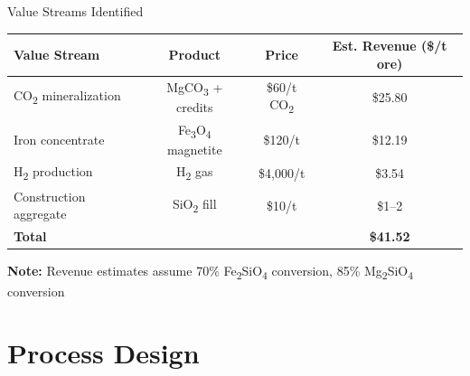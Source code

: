\documentclass[aspectratio=169]{beamer}
\begin{document}
\begin{frame}{Value Streams Identified}

\begin{table}
\centering\small
\begin{tabular}{lccc}
\toprule
\textbf{Value Stream} & \textbf{Product} & \textbf{Price} & \textbf{Est. Revenue (\$/t ore)} \\
\midrule
CO\textsubscript{2} mineralization & MgCO\textsubscript{3} + credits & \$60/t CO\textsubscript{2} & \textcolor{revenue}{\$25.80} \\
Iron concentrate & Fe\textsubscript{3}O\textsubscript{4} magnetite & \$120/t & \textcolor{revenue}{\$12.19} \\
H\textsubscript{2} production & H\textsubscript{2} gas & \$4,000/t & \textcolor{revenue}{\$3.54} \\
Construction aggregate & SiO\textsubscript{2} fill & \$10/t & \textcolor{neutral}{\$1--2} \\
\midrule
\textbf{Total} & & & \textcolor{revenue}{\textbf{\$41.52}} \\
\bottomrule
\end{tabular}
\end{table}

\vspace{0.5em}
\textcolor{StepYellow}{\textbf{Note:}} Revenue estimates assume 70\% Fe\textsubscript{2}SiO\textsubscript{4} conversion, 85\% Mg\textsubscript{2}SiO\textsubscript{4} conversion
\end{frame}

\section{Process Design}
\end{document}
